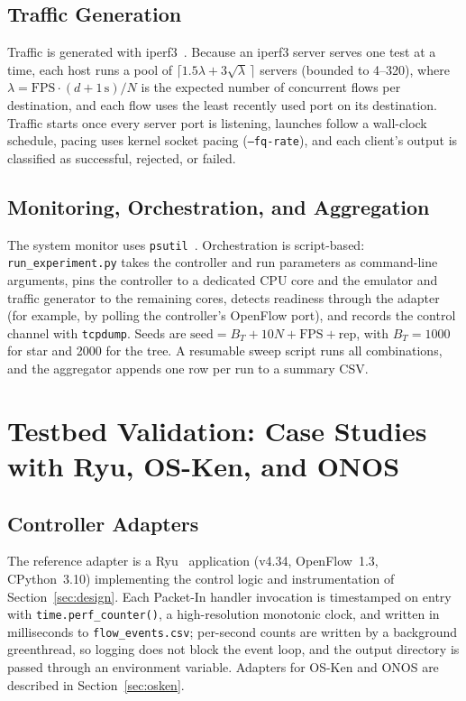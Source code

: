 \documentclass[conference]{IEEEtran}
\begin{document}
\subsection{Traffic Generation}

Traffic is generated with iperf3~\cite{iperf3}. Because an
iperf3 server serves one test at a time, each host runs a pool of
$\lceil 1.5\lambda + 3\sqrt{\lambda}\,\rceil$ servers (bounded
to 4--320), where $\lambda = \text{FPS}\cdot(d+1\,\text{s})/N$ is
the expected number of concurrent flows per destination, and each
flow uses the least recently used port on its destination. Traffic
starts once every server port is listening, launches follow a
wall-clock schedule, pacing uses kernel socket pacing
(\texttt{--fq-rate}), and each client's output is classified as
successful, rejected, or failed.

\subsection{Monitoring, Orchestration, and Aggregation}

The system monitor uses \texttt{psutil}~\cite{psutil}.
Orchestration is script-based: \texttt{run\_experiment.py}
takes the controller and run parameters as command-line arguments,
pins the controller to a dedicated CPU core and the emulator and
traffic generator to the remaining cores, detects readiness through
the adapter (for example, by polling the controller's OpenFlow
port), and records the control
channel with \texttt{tcpdump}. Seeds are
$\text{seed} = B_T + 10N + \text{FPS} + \text{rep}$, with
$B_T = 1000$ for star and 2000 for the tree. A resumable sweep
script runs all combinations, and the aggregator appends one row
per run to a summary CSV.



\section{Testbed Validation: Case Studies with Ryu, OS-Ken, and ONOS}
\label{sec:demo}

\subsection{Controller Adapters}

The reference adapter is a Ryu~\cite{RyuFramework} application
(v4.34, OpenFlow~1.3, CPython~3.10) implementing the control logic and
instrumentation of Section~\ref{sec:design}. Each Packet-In
handler invocation is timestamped on entry with
\texttt{time.perf\_counter()}, a high-resolution monotonic clock,
and written in milliseconds to \texttt{flow\_events.csv};
per-second counts are written by a background greenthread, so
logging does not block the event loop, and the output directory is
passed through an environment variable. Adapters for OS-Ken and ONOS are described in
Section~\ref{sec:osken}.
\end{document}
